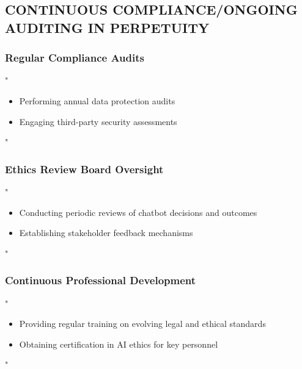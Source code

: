 \documentclass[14pt,a4paper]{article}
\begin{document}
\textit{\parencite{EC2024}}

\subsection*{CONTINUOUS COMPLIANCE/ONGOING AUDITING IN PERPETUITY}

\subsubsection*{Regular Compliance Audits}
"
\begin{itemize}
    \item Performing annual data protection audits
    \item Engaging third-party security assessments
\end{itemize}
"

\textit{\parencite{ICO2024}}

\subsubsection*{Ethics Review Board Oversight}
"
\begin{itemize}
    \item Conducting periodic reviews of chatbot decisions and outcomes
    \item Establishing stakeholder feedback mechanisms
\end{itemize}
"

\textit{\parencite{AIEthicsBoard2024}}

\subsubsection*{Continuous Professional Development}
"
\begin{itemize}
    \item Providing regular training on evolving legal and ethical standards
    \item Obtaining certification in AI ethics for key personnel
\end{itemize}
"

\textit{\parencite{CIPD2024}}


\newpage

\printbibliography
\end{document}
